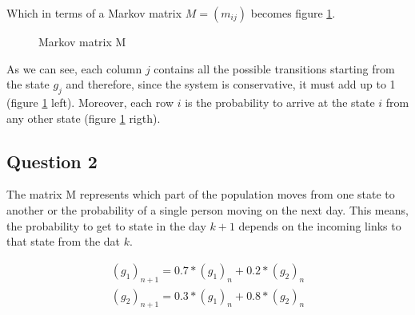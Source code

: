 \documentclass{article}
\begin{document}
Which in terms of a Markov matrix $M=(m_{ij})$ becomes figure \ref{fig:mm1}. 

\newcommand{\myunit}{1 cm}
\begin{figure}
\begin{center}
\end{center}
\caption{Markov matrix M}
\label{fig:mm1}
\end{figure}

As we can see, each column $j$ contains all the possible transitions starting
from the state $g_j$ and therefore, since the system is conservative,
it must add up to 1 (figure \ref{fig:mm1} left). 
Moreover, each row $i$ is the probability to arrive at the state $i$ 
from any other state (figure \ref{fig:mm1} rigth).

\subsection{Question 2}

The matrix M represents which part of the population moves from one state to
another or the probability of a single person moving on the next day. 
This means, the probability to get to state in the day $k+1$ depends on
the incoming links to that state from the dat $k$.

\begin{equation}
\begin{aligned}
(g_1)_{n+1} = 0.7*(g_1)_n + 0.2*(g_2)_n \\
(g_2)_{n+1} = 0.3*(g_1)_n + 0.8*(g_2)_n
\end{aligned}
\end{equation} 
\end{document}
